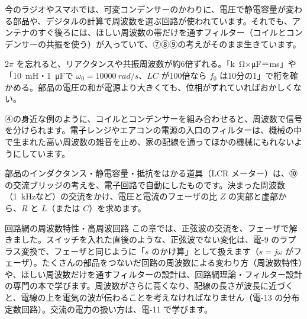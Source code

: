 \begin{phkougaku}
今のラジオやスマホでは、可変コンデンサーのかわりに、電圧で静電容量が変わる部品や、デジタルの計算で周波数を選ぶ回路が使われています。それでも、アンテナのすぐ後ろには、ほしい周波数の帯だけを通すフィルター（コイルとコンデンサーの共振を使う）が入っていて、⑦⑧⑨の考えがそのまま生きています。

\begin{phketa}[交流回路の数の目安]
$2\pi$ を忘れると、リアクタンスや共振周波数が約6倍ずれる。「\si{k\ohm}×\si{\micro F}＝ms」や「\qty{10}{mH}・\qty{1}{\micro F}で $\omega_0=\qty{10000}{rad/s}$、$LC$ が100倍なら $f_0$ は10分の1」で桁を確かめる。部品の電圧の和が電源より大きくても、位相がずれていればおかしくない。
\end{phketa}

④の身近な例のように、コイルとコンデンサーを組み合わせると、周波数で信号を分けられます。電子レンジやエアコンの電源の入口のフィルターは、機械の中で生まれた高い周波数の雑音を止め、家の配線を通ってほかの機械にもれないようにしています。

部品のインダクタンス・静電容量・抵抗をはかる道具（LCR メーター）は、⑩の交流ブリッジの考えを、電子回路で自動にしたものです。決まった周波数（\qty{1}{kHz}など）の交流をかけ、電圧と電流のフェーザの比 $Z$ の実部と虚部から、$R$ と $L$（または $C$）を求めます。
\end{phkougaku}

\begin{phsaki}{回路網の周波数特性・高周波回路}
この章では、正弦波の交流を、フェーザで解きました。スイッチを入れた直後のような、正弦波でない変化は、電-9 のラプラス変換で、フェーザと同じように「$s$ のかけ算」として扱えます（$s=j\omega$ がフェーザ）。たくさんの部品をつないだ回路の周波数による変わり方（周波数特性）や、ほしい周波数だけを通すフィルターの設計は、回路網理論・フィルター設計の専門の本で学びます。周波数がさらに高くなり、配線の長さが波長に近づくと、電線の上を電気の波が伝わることを考えなければなりません（電-13 の分布定数回路）。交流の電力の扱い方は、電-11 で学びます。
\end{phsaki}

